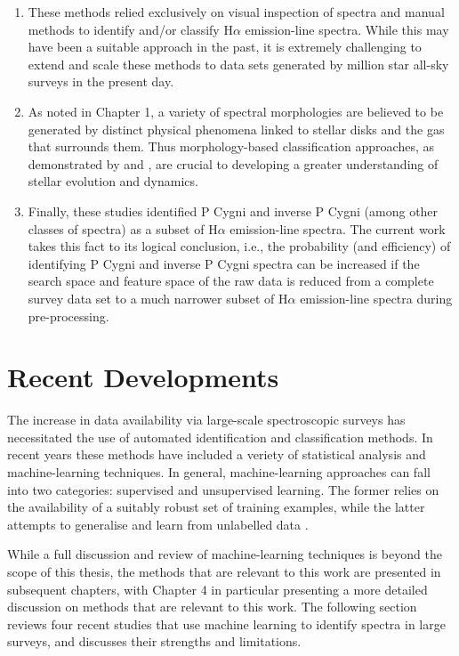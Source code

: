 \begin{enumerate}
\item These methods relied exclusively on visual inspection of spectra and manual methods to identify and/or classify H$\alpha$ emission-line spectra. While this may have been a suitable approach in the past, it is extremely challenging to extend and scale these methods to data sets generated by million star all-sky surveys in the present day.
\item As noted in Chapter 1, a variety of spectral morphologies are believed to be generated by distinct physical phenomena linked to stellar disks and the gas that surrounds them. Thus morphology-based classification approaches, as demonstrated by \citet{reipurth1996halpha} and \citet{1953PDAO....9....1B}, are crucial to developing a greater understanding of stellar evolution and dynamics.
\item Finally, these studies identified P Cygni and inverse P Cygni (among other classes of spectra) as a subset of H$\alpha$ emission-line spectra. The current work takes this fact to its logical conclusion, i.e., the probability (and efficiency) of identifying P Cygni and inverse P Cygni spectra can be increased if the search space and feature space of the raw data is reduced from a complete survey data set \citep[e.g., the complete GALAH survey DR3 catalogue;][]{buder2021galah+} to a much narrower subset of H$\alpha$ emission-line spectra during pre-processing. 
\end{enumerate}

\section{Recent Developments}
The increase in data availability via large-scale spectroscopic surveys has necessitated the use of automated identification and classification methods. In recent years these methods have included a veriety of statistical analysis and machine-learning techniques. In general, machine-learning approaches can fall into two categories: supervised and unsupervised learning. The former relies on the availability of a suitably robust set of training examples, while the latter attempts to generalise and learn from unlabelled data \citep{hastie2009elements}. 

While a full discussion and review of machine-learning techniques is beyond the scope of this thesis, the methods that are relevant to this work are presented in subsequent chapters, with Chapter 4 in particular presenting a more detailed discussion on methods that are relevant to this work. The following section reviews four recent studies that use machine learning to identify spectra in large surveys, and discusses their strengths and limitations.


